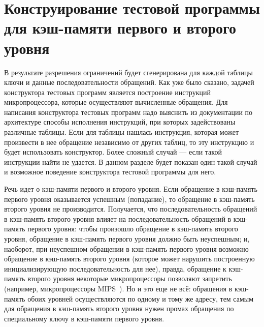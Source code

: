 

\section{Конструирование тестовой программы для кэш-памяти первого и второго
уровня}

В результате разрешения ограничений будет сгенерирована для каждой таблицы ключи
и данные последовательности обращений. Как уже было сказано, задачей
конструктора тестовых программ является построение инструкций микропроцессора,
которые осуществляют вычисленные обращения. Для написания конструктора тестовых
программ надо выяснить из документации по архитектуре способы исполнения
инструкций, при которых задействованы различные таблицы. Если для таблицы
нашлась инструкция, которая может произвести в нее обращение независимо от
других таблиц, то эту инструкцию и будет использовать конструктор. Более сложный
случай --- если такой инструкции найти не удается. В данном разделе будет
показан один такой случай и возможное поведение конструктора тестовой программы
для него.

Речь идет о кэш-памяти первого и второго уровня. Если обращение в кэш-память
первого уровня оказывается успешным (попадание), то обращение в кэш-память
второго уровня не производится. Получается, что последовательность обращений в
кэш-память второго уровня влияет на последовательность обращений в кэш-память
первого уровня: чтобы произошло обращение в кэш-память второго уровня, обращение
в кэш-память первого уровня должно быть неуспешным; и, наоборот, при неуспешном
обращении в кэш-память первого уровня возможно обращение в кэш-память второго
уровня (которое может нарушить построенную инициализирующую последовательность
для нее), правда, обращение к кэш-память второго уровня некоторые
микропроцессоры позволяют запретить (например, микропроцессоры
MIPS~\cite{mips64III}). Но и это еще не всё: обращения в кэш-память обоих
уровней осуществляются по одному и тому же адресу, тем самым для обращения в
кэш-память второго уровня нужен промах обращения по специальному ключу в
кэш-памяти первого уровня.


